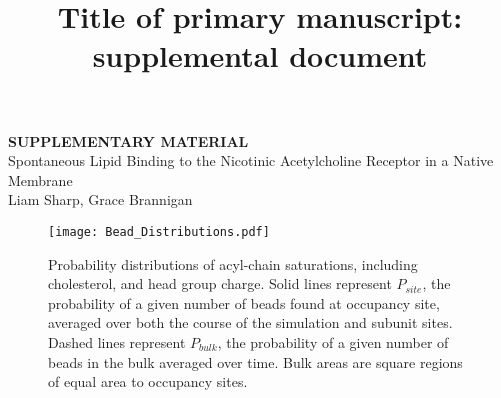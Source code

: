 \documentclass[9pt]{article}
\title{Title of primary manuscript: supplemental document}
\begin{document}
\begin{titlepage}
   \begin{center}
      \huge\textbf{SUPPLEMENTARY MATERIAL}\\
      \LARGE{Spontaneous Lipid Binding to the Nicotinic Acetylcholine Receptor in a Native Membrane}\\
      
      
      Liam Sharp, Grace Brannigan
   \end{center}
   
\end{titlepage}

\renewcommand{\thefigure}{SI 1}
\begin{figure*}[!h]
	\center
	\texttt{[image: Bead\_Distributions.pdf]}
	\caption{Probability distributions of acyl-chain saturations, including cholesterol, and head group charge. Solid lines represent $P_{site}$, the probability of a given number of beads found at occupancy site, averaged over both the course of the simulation and subunit sites. Dashed lines represent  $P_{bulk}$, the probability of a given number of beads in the bulk averaged over time. Bulk areas are square regions of equal area to occupancy sites.}
	\label{fig:lipidDist}
\end{figure*}
\end{document}
